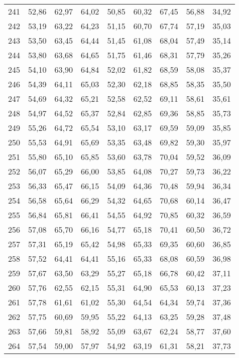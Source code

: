 \begin{longtable}{c c c c c c c c c}
241	& 52,86	& 62,97	& 64,02	& 50,85	& 60,32	& 67,45	& 56,88	& 34,92 \\
242	& 53,19	& 63,22	& 64,23	& 51,15	& 60,70	& 67,74	& 57,19	& 35,03 \\
243	& 53,50	& 63,45	& 64,44	& 51,45	& 61,08	& 68,04	& 57,49	& 35,14 \\
244	& 53,80	& 63,68	& 64,65	& 51,75	& 61,46	& 68,31	& 57,79	& 35,26 \\
245	& 54,10	& 63,90	& 64,84	& 52,02	& 61,82	& 68,59	& 58,08	& 35,37 \\
246	& 54,39	& 64,11	& 65,03	& 52,30	& 62,18	& 68,85	& 58,35	& 35,50 \\
247	& 54,69	& 64,32	& 65,21	& 52,58	& 62,52	& 69,11	& 58,61	& 35,61 \\
248	& 54,97	& 64,52	& 65,37	& 52,84	& 62,85	& 69,36	& 58,85	& 35,73 \\
249	& 55,26	& 64,72	& 65,54	& 53,10	& 63,17	& 69,59	& 59,09	& 35,85 \\
250	& 55,53	& 64,91	& 65,69	& 53,35	& 63,48	& 69,82	& 59,30	& 35,97 \\
251	& 55,80	& 65,10	& 65,85	& 53,60	& 63,78	& 70,04	& 59,52	& 36,09 \\
252	& 56,07	& 65,29	& 66,00	& 53,85	& 64,08	& 70,27	& 59,73	& 36,22 \\
253	& 56,33	& 65,47	& 66,15	& 54,09	& 64,36	& 70,48	& 59,94	& 36,34 \\
254	& 56,58	& 65,64	& 66,29	& 54,32	& 64,65	& 70,68	& 60,14	& 36,47 \\
255	& 56,84	& 65,81	& 66,41	& 54,55	& 64,92	& 70,85	& 60,32	& 36,59 \\
256	& 57,08	& 65,70	& 66,16	& 54,77	& 65,18	& 70,41	& 60,50	& 36,72 \\
257	& 57,31	& 65,19	& 65,42	& 54,98	& 65,33	& 69,35	& 60,60	& 36,85 \\
258	& 57,52	& 64,41	& 64,41	& 55,16	& 65,33	& 68,08	& 60,59	& 36,98 \\
259	& 57,67	& 63,50	& 63,29	& 55,27	& 65,18	& 66,78	& 60,42	& 37,11 \\
260	& 57,76	& 62,55	& 62,15	& 55,31	& 64,90	& 65,53	& 60,13	& 37,23 \\
261	& 57,78	& 61,61	& 61,02	& 55,30	& 64,54	& 64,34	& 59,74	& 37,36 \\
262	& 57,75	& 60,69	& 59,95	& 55,22	& 64,13	& 63,25	& 59,28	& 37,48 \\
263	& 57,66	& 59,81	& 58,92	& 55,09	& 63,67	& 62,24	& 58,77	& 37,60 \\
264	& 57,54	& 59,00	& 57,97	& 54,92	& 63,19	& 61,31	& 58,21	& 37,73 \\

\end{longtable}
